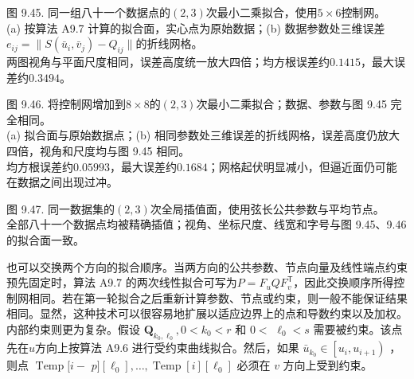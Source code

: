 \documentclass[../main.tex]{subfiles}
\begin{document}
\begin{center}
\begin{minipage}{34cm}
\vspace*{.6\baselineskip}
\centering
{}
\par\smallskip
图 9.45. 同一组八十一个数据点的$(2,3)$次最小二乘拟合，使用$5\times6$控制网。\\
(a) 按算法 A9.7 计算的拟合面，实心点为原始数据；(b) 数据参数处三维误差$e_{ij}=\|S(\bar u_i,\bar v_j)-Q_{ij}\|$的折线网格。\\
两图视角与平面尺度相同，误差高度统一放大四倍；均方根误差约$0.1415$，最大误差约$0.3494$。
\end{minipage}
\end{center}

\begin{center}
\begin{minipage}{34cm}
\vspace*{.6\baselineskip}
\centering
{}\hspace{1.3cm}
\par\smallskip
图 9.46. 将控制网增加到$8\times8$的$(2,3)$次最小二乘拟合；数据、参数与图 9.45 完全相同。\\
(a) 拟合面与原始数据点；(b) 相同参数处三维误差的折线网格，误差高度仍放大四倍，视角和尺度均与图 9.45 相同。\\
均方根误差约$0.05993$，最大误差约$0.1684$；网格起伏明显减小，但逼近面仍可能在数据之间出现过冲。
\end{minipage}
\end{center}

\begin{center}
\begin{minipage}{22cm}
\vspace*{.6\baselineskip}
\centering
{}
\par\smallskip
图 9.47. 同一数据集的$(2,3)$次全局插值面，使用弦长公共参数与平均节点。\\
全部八十一个数据点均被精确插值；视角、坐标尺度、线宽和字号与图 9.45、9.46 的拟合面一致。
\end{minipage}
\end{center}

也可以交换两个方向的拟合顺序。当两方向的公共参数、节点向量及线性端点约束预先固定时，算法 A9.7 的两次线性拟合可写为$P=F_uQF_v^{\mathsf T}$，因此交换顺序所得控制网相同。若在第一轮拟合之后重新计算参数、节点或约束，则一般不能保证结果相同。显然，这种技术可以很容易地扩展以适应边界上的点和导数约束以及加权。内部约束则更为复杂。假设 \({\mathbf{Q}}_{{k}_{0},{\ell }_{0}},0 < {k}_{0} < r\) 和 \(0 <\)  \({\ell }_{0} < s\) 需要被约束。该点先在\(u\)方向上按算法 A9.6 进行受约束曲线拟合。然后，如果 \({\bar{u}}_{{k}_{0}} \in  \left\lbrack  {{u}_{i},{u}_{i + 1}}\right)\) ，则点 \(\operatorname{Temp}\lbrack i -\)  \(p\rbrack \left\lbrack  {\ell }_{0}\right\rbrack  ,\ldots ,\operatorname{Temp}\left\lbrack  i\right\rbrack  \left\lbrack  {\ell }_{0}\right\rbrack\) 必须在 \(v\) 方向上受到约束。
\end{document}
